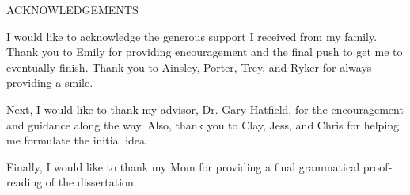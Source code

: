 \documentclass[SDSUThesis.tex]{subfiles}
\begin{document}
\newpage

\begin{center}
ACKNOWLEDGEMENTS
\end{center}

I would like to acknowledge the generous support I received from my family. Thank you
to Emily for providing encouragement and the final push to get me to eventually finish.
Thank you to Ainsley, Porter, Trey, and Ryker for always providing a smile.

Next, I would like to thank my advisor, Dr. Gary Hatfield, for the encouragement and guidance
along the way.  Also, thank you to Clay, Jess, and Chris for helping me formulate 
the initial idea.  

Finally, I would like to thank my Mom for providing a 
final grammatical proof-reading of the dissertation.
\end{document}
